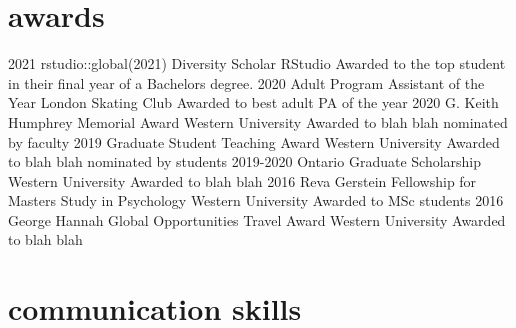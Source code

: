 \documentclass[]{k-cv} %
\begin{document}
\clearpage



\section{awards}

\begin{entrylist}
\entry
{2021}
{rstudio::global(2021) Diversity Scholar}
{RStudio}
{Awarded to the top student in their final year of a Bachelors degree.}
\entry
{2020}
{Adult Program Assistant of the Year}
{London Skating Club}
{Awarded to best adult PA of the year}
\entry
{2020}
{G. Keith Humphrey Memorial Award}
{Western University}
{Awarded to blah blah nominated by faculty}
\entry
{2019}
{Graduate Student Teaching Award}
{Western University}
{Awarded to blah blah nominated by students}
\entry
{2019-2020}
{Ontario Graduate Scholarship}
{Western University}
{Awarded to blah blah}
\entry
{2016}
{Reva Gerstein Fellowship for Masters Study in Psychology}
{Western University}
{Awarded to MSc students}
\entry
{2016}
{George Hannah Global Opportunities Travel Award}
{Western University}
{Awarded to blah blah}
\end{entrylist}


\section{communication skills}
\end{document}
